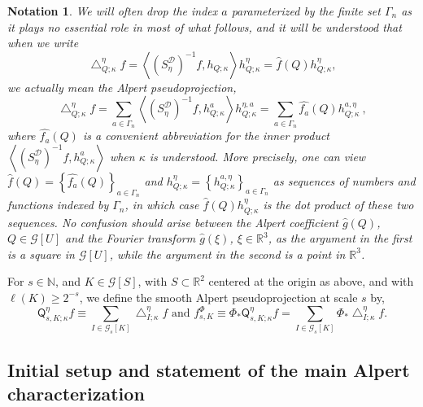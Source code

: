 \documentclass{amsart}%
\theoremstyle{plain}
\newtheorem{notation}[theorem]{Notation}
\numberwithin{equation}{section}
\begin{document}
\begin{notation}
\label{Notation Alpert} We will often drop the index $a$ parameterized by the
finite set $\Gamma_{n}$ as it plays no essential role in most of what follows,
and it will be understood that when we write
\[
\bigtriangleup_{Q;\kappa}^{\eta}f=\left\langle \left(  S_{\eta}^{\mathcal{D}%
}\right)  ^{-1}f,h_{Q;\kappa}\right\rangle h_{Q;\kappa}^{\eta}=\widehat
{f}\left(  Q\right)  h_{Q;\kappa}^{\eta},
\]
we \emph{actually} mean the Alpert \emph{pseudoprojection},%
\[
\bigtriangleup_{Q;\kappa}^{\eta}f=\sum_{a\in\Gamma_{n}}\left\langle \left(
S_{\eta}^{\mathcal{D}}\right)  ^{-1}f,h_{Q;\kappa}^{a}\right\rangle
h_{Q;\kappa}^{\eta,a}=\sum_{a\in\Gamma_{n}}\widehat{f_{a}}\left(  Q\right)
h_{Q;\kappa}^{a,\eta}\ ,
\]
where $\widehat{f_{a}}\left(  Q\right)  $ is a convenient abbreviation for the
inner product $\left\langle \left(  S_{\eta}^{\mathcal{D}}\right)
^{-1}f,h_{Q;\kappa}^{a}\right\rangle $ when $\kappa$ is understood. More
precisely, one can view $\widehat{f}\left(  Q\right)  =\left\{  \widehat
{f_{a}}\left(  Q\right)  \right\}  _{a\in\Gamma_{n}}$ and $h_{Q;\kappa}^{\eta
}=\left\{  h_{Q;\kappa}^{a,\eta}\right\}  _{a\in\Gamma_{n}}$ as sequences of
numbers and functions indexed by $\Gamma_{n}$, in which case $\widehat
{f}\left(  Q\right)  h_{Q;\kappa}^{\eta}$ is the dot product of these two
sequences. No confusion should arise between the Alpert coefficient
$\widehat{g}\left(  Q\right)  $, $Q\in\mathcal{G}\left[  U\right]  $ and the
Fourier transform $\widehat{g}\left(  \xi\right)  $, $\xi\in\mathbb{R}^{3}$,
as the argument in the first is a square in $\mathcal{G}\left[  U\right]  $,
while the argument in the second is a point in $\mathbb{R}^{3}$.
\end{notation}

For $s\in\mathbb{N}$, and $K\in\mathcal{G}\left[  S\right]  $, with
$S\subset\mathbb{R}^{2}$ centered at the origin as above, and with
$\ell\left(  K\right)  \geq2^{-s}$, we define the smooth Alpert
pseudoprojection at scale $s$ by,%
\begin{equation}
\mathsf{Q}_{s,K;\kappa}^{\eta}f\equiv\sum_{I\in\mathcal{G}_{s}\left[
K\right]  }\bigtriangleup_{I;\kappa}^{\eta}f\text{ and }f_{s,K}^{\Phi}%
\equiv\Phi_{\ast}\mathsf{Q}_{s,K;\kappa}^{\eta}f=\sum_{I\in\mathcal{G}%
_{s}\left[  K\right]  }\Phi_{\ast}\bigtriangleup_{I;\kappa}^{\eta
}f.\label{def A proj}%
\end{equation}


\subsection{Initial setup and statement of the main Alpert characterization}
\end{document}
